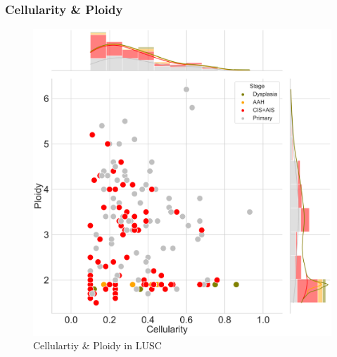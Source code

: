 \documentclass{beamer}
\begin{document}
            \begin{frame}
                \frametitle{Cellularity \& Ploidy}

                \begin{figure}
                    \includegraphics[width=0.4 \linewidth]{figures/Sequenza/BWA-sequenza-SQC.pdf}
                    \caption{Cellulartiy \& Ploidy in LUSC}
                \end{figure}
            \end{frame}
\end{document}
